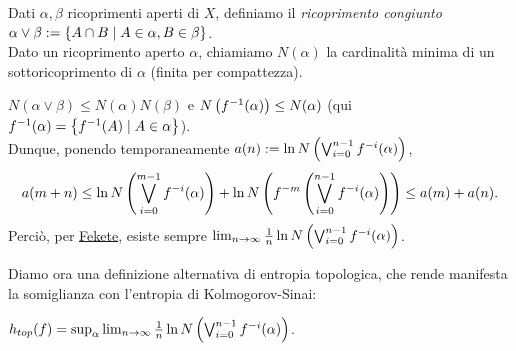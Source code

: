 \begin{defi}Dati $\alpha,\beta$ ricoprimenti aperti di $X$, definiamo il \emph{ricoprimento congiunto}
$\alpha\vee\beta:=\left\{A\cap B\mid A\in\alpha,B\in\beta\right\}$. \\
Dato un ricoprimento aperto $\alpha$, chiamiamo $N(\alpha)$ la cardinalità minima di un sottoricoprimento di $\alpha$
(finita per compattezza).
\end{defi}

\begin{oss}$N(\alpha\vee\beta)\le N(\alpha)N(\beta)$ e $N\left(f^{-1}(\alpha)\right)\le N(\alpha)$
(qui $f^{-1}(\alpha)=\left\{f^{-1}(A)\mid A\in\alpha\right\}$). \\
Dunque, ponendo temporaneamente $a(n):=\ln N\left(\bigvee_{i=0}^{n-1}f^{-i}(\alpha)\right)$,
\[ a(m+n)\le\ln N\left(\bigvee_{i=0}^{m-1}f^{-i}(\alpha)\right)+\ln N\left(f^{-m}\left(\bigvee_{i=0}^{n-1}f^{-i}(\alpha)\right)\right)
\le a(m)+a(n). \]
Perciò, per \hyperref[fekete]{Fekete}, esiste sempre $\lim_{n\to\infty}\frac{1}{n}\ln N\left(\bigvee_{i=0}^{n-1}f^{-i}(\alpha)\right)$.
\end{oss}

Diamo ora una definizione alternativa di entropia topologica, che rende manifesta la somiglianza con l'entropia
di Kolmogorov-Sinai:

\begin{teo}$h_{top}(f)=\sup_\alpha\lim_{n\to\infty}\frac{1}{n}\ln N\left(\bigvee_{i=0}^{n-1}f^{-i}(\alpha)\right)$.
\end{teo}

